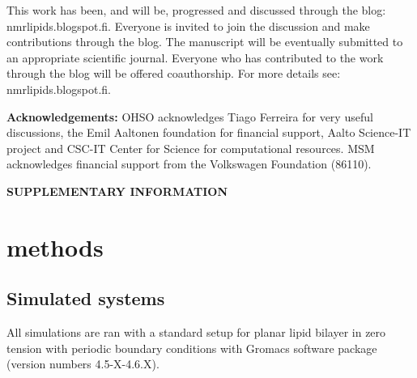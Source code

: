 \documentclass[pre,aps,floatfix,authordate1-4,twocolumn]{revtex4-1}
\begin{document}

This work has been, and will be, progressed and discussed through the blog: nmrlipids.blogspot.fi. 
Everyone is invited to join the discussion and make contributions through the blog. 
The manuscript will be eventually submitted to an appropriate scientific journal. 
Everyone who has contributed to the work through the blog will be offered 
coauthorship. For more details see: nmrlipids.blogspot.fi.   

{\bf Acknowledgements: }
OHSO acknowledges Tiago Ferreira for very useful discussions, the Emil Aaltonen foundation for financial support, Aalto Science-IT project and CSC-IT Center for Science for computational resources. 
%
MSM acknowledges financial support from the Volkswagen Foundation (86110).

\newpage

\appendix
\begin{center}
{\bf SUPPLEMENTARY INFORMATION}
\end{center}

\section{methods}

\subsection{Simulated systems}
All simulations are ran with a standard setup for planar lipid bilayer in zero tension
with periodic boundary conditions with Gromacs software package (version numbers 4.5-X-4.6.X).

\end{document}
